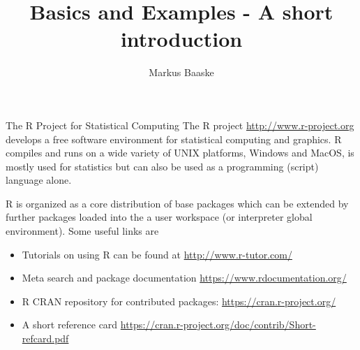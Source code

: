 \documentclass[10pt]{beamer}
\title{\proglang{R} Basics and Examples - A short introduction}
\author{Markus Baaske}
\institute{Faculty of Mathematics and Computer Science (FSU Jena)}
\let\proglang=\textsf
\begin{document}
\maketitle

\begin{frame}{The R Project for Statistical Computing}
The \proglang{R} project \url{http://www.r-project.org} develops a free
software environment for statistical computing and graphics. \proglang{R}
compiles and runs on a wide variety of UNIX platforms, Windows and MacOS, is mostly used for statistics but can also be
used as a programming (script) language alone. \par
\proglang{R} is organized as a core distribution of base packages which can be
extended by further packages loaded into the a user workspace (or interpreter
global environment). Some useful links are
\begin{itemize}
  \item Tutorials on using \proglang{R} can be
  found at \url{http://www.r-tutor.com/}
  \item Meta search and package
  documentation \url{https://www.rdocumentation.org/}
  \item \proglang{R} CRAN repository for contributed packages:
  \url{https://cran.r-project.org/}
  \item A short reference card \url{https://cran.r-project.org/doc/contrib/Short-refcard.pdf}
\end{itemize}
\end{frame}
%
\end{document}
